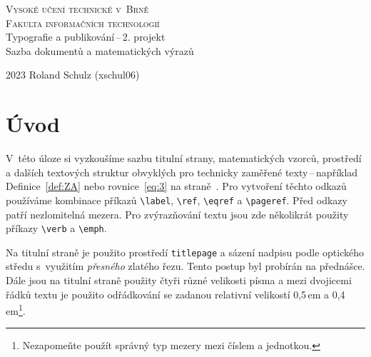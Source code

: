 \documentclass[twocolumn,a4paper,11pt]{article}
\begin{document}
\begin{titlepage}
    \begin{center}
        {\Huge \textsc{Vysoké učení technické v~Brně} \\[0.5em]} {\huge \textsc{Fakulta informačních technologií}} \\
        {\LARGE Typografie a publikování\,--\,2. projekt \\[0.4em] Sazba dokumentů a matematických výrazů }\\
    \end{center}

    {\Large 2023 \hfill Roland Schulz (xschul06)}
    \thispagestyle{empty}
\end{titlepage}


\section*{Úvod}
\label{sec:intro}
V~této úloze si vyzkoušíme sazbu titulní strany, matematických vzorců, prostředí a dalších textových struktur obvyklých pro technicky zaměřené texty\,--\,například Definice~\ref{def:ZA} nebo rovnice~\eqref{eq:3} na straně~\pageref{sec:rovnice}. Pro vytvoření těchto odkazů používáme kombinace příkazů \verb|\label|, \verb|\ref|, \verb|\eqref| a \verb|\pageref|. Před odkazy patří nezlomitelná mezera. Pro zvýrazňování textu jsou zde několikrát použity příkazy \verb|\verb| a \verb|\emph|.

Na titulní straně je použito prostředí \verb|titlepage| a sázení nadpisu podle optického středu s~využitím \emph{přesného} zlatého řezu. Tento postup byl probírán na přednášce. Dále jsou na titulní straně použity čtyři různé velikosti písma a mezi dvojicemi řádků textu je použito odřádkování se zadanou relativní velikostí 0,5\,em a 0,4\,em\footnote{Nezapomeňte použít správný typ mezery mezi číslem a jednotkou.}.
\end{document}
